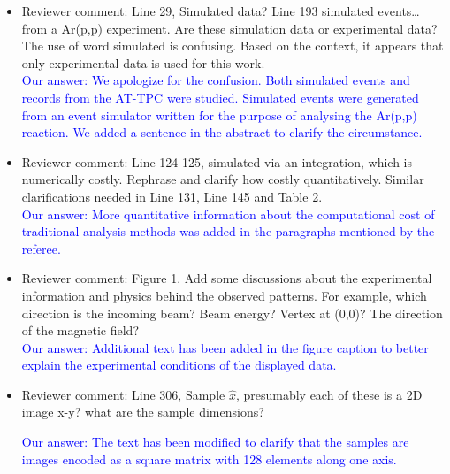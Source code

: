 \documentclass[12pt]{article}
\begin{document}
\begin{itemize}
\item Reviewer comment: Line 29, Simulated data? Line 193 simulated events… from a Ar(p,p) experiment. Are these
simulation data or experimental data? The use of word simulated is confusing. Based on the context,
it appears that only experimental data is used for this work.\\
\textcolor{blue}{Our answer: We apologize for the confusion. Both simulated events and records from the AT-TPC were studied. Simulated events were generated from an event simulator written for the purpose of analysing the Ar(p,p) reaction. We added a sentence in the abstract to clarify the circumstance. }
\item Reviewer comment: Line 124-125, simulated via an integration, which is numerically costly. Rephrase and clarify how
costly quantitatively. Similar clarifications needed in Line 131, Line 145 and Table 2.\\
\textcolor{blue}{Our answer: More quantitative information about the computational cost of traditional analysis methods was added in the paragraphs mentioned by the referee.}
\item Reviewer comment: Figure 1. Add some discussions about the experimental information and physics behind the
observed patterns. For example, which direction is the incoming beam? Beam energy? Vertex at
(0,0)? The direction of the magnetic field?\\

\textcolor{blue}{Our answer: Additional text has been added in the figure caption to better explain the experimental conditions of the displayed data.}
\item Reviewer comment: Line 306, Sample $\hat{x}$, presumably each of these is a 2D image x-y? what are the sample
dimensions?

\textcolor{blue}{Our answer: The text has been modified to clarify that the samples are images encoded as a square matrix with 128 elements along one axis.}
    

\end{itemize}
\end{document}
